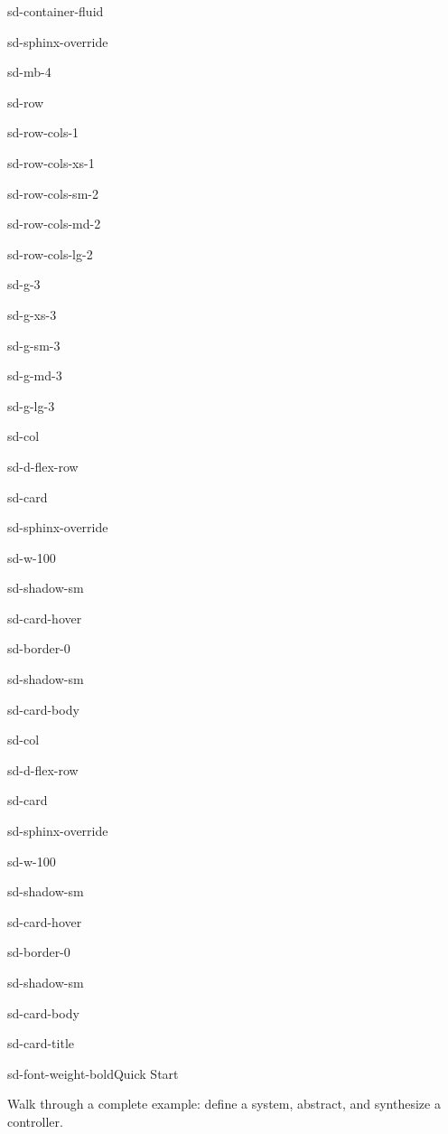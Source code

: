 \documentclass[a4paper,10pt,english]{sphinxmanual}
\begin{document}
\begin{sphinxuseclass}{sd-container-fluid}
\begin{sphinxuseclass}{sd-sphinx-override}
\begin{sphinxuseclass}{sd-mb-4}
\begin{sphinxuseclass}{sd-row}
\begin{sphinxuseclass}{sd-row-cols-1}
\begin{sphinxuseclass}{sd-row-cols-xs-1}
\begin{sphinxuseclass}{sd-row-cols-sm-2}
\begin{sphinxuseclass}{sd-row-cols-md-2}
\begin{sphinxuseclass}{sd-row-cols-lg-2}
\begin{sphinxuseclass}{sd-g-3}
\begin{sphinxuseclass}{sd-g-xs-3}
\begin{sphinxuseclass}{sd-g-sm-3}
\begin{sphinxuseclass}{sd-g-md-3}
\begin{sphinxuseclass}{sd-g-lg-3}
\begin{sphinxuseclass}{sd-col}
\begin{sphinxuseclass}{sd-d-flex-row}
\begin{sphinxuseclass}{sd-card}
\begin{sphinxuseclass}{sd-sphinx-override}
\begin{sphinxuseclass}{sd-w-100}
\begin{sphinxuseclass}{sd-shadow-sm}
\begin{sphinxuseclass}{sd-card-hover}
\begin{sphinxuseclass}{sd-border-0}
\begin{sphinxuseclass}{sd-shadow-sm}
\begin{sphinxuseclass}{sd-card-body}
\end{sphinxuseclass}{\hyperref[\detokenize{getting-started/installation::doc}]{}}
\end{sphinxuseclass}
\end{sphinxuseclass}
\end{sphinxuseclass}
\end{sphinxuseclass}
\end{sphinxuseclass}
\end{sphinxuseclass}
\end{sphinxuseclass}
\end{sphinxuseclass}
\end{sphinxuseclass}
\begin{sphinxuseclass}{sd-col}
\begin{sphinxuseclass}{sd-d-flex-row}
\begin{sphinxuseclass}{sd-card}
\begin{sphinxuseclass}{sd-sphinx-override}
\begin{sphinxuseclass}{sd-w-100}
\begin{sphinxuseclass}{sd-shadow-sm}
\begin{sphinxuseclass}{sd-card-hover}
\begin{sphinxuseclass}{sd-border-0}
\begin{sphinxuseclass}{sd-shadow-sm}
\begin{sphinxuseclass}{sd-card-body}
\begin{sphinxuseclass}{sd-card-title}
\begin{sphinxuseclass}{sd-font-weight-bold}Quick Start
\end{sphinxuseclass}
\end{sphinxuseclass}
\sphinxAtStartPar
Walk through a complete example: define a system, abstract, and synthesize a controller.


\end{sphinxuseclass}
\end{sphinxuseclass}
\end{sphinxuseclass}
\end{sphinxuseclass}
\end{sphinxuseclass}
\end{sphinxuseclass}
\end{sphinxuseclass}
\end{sphinxuseclass}
\end{sphinxuseclass}
\end{sphinxuseclass}
\end{sphinxuseclass}
\end{sphinxuseclass}
\end{sphinxuseclass}
\end{sphinxuseclass}
\end{sphinxuseclass}
\end{sphinxuseclass}
\end{sphinxuseclass}
\end{sphinxuseclass}
\end{sphinxuseclass}
\end{sphinxuseclass}
\end{sphinxuseclass}
\end{sphinxuseclass}
\end{sphinxuseclass}
\end{sphinxuseclass}
\end{document}
